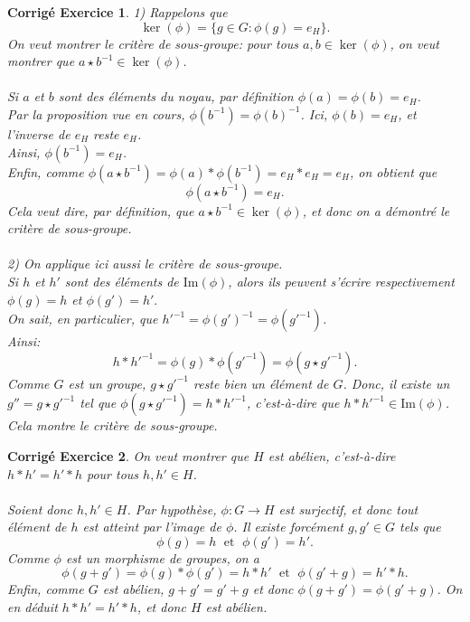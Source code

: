 \documentclass[11pt,french,table]{article}
\theoremstyle{exercice}
\theoremstyle{corrigé}
\newtheorem{corrigé}{Corrigé Exercice}
\begin{document}
\vspace{2em}
\begin{corrigé}
1) Rappelons que $$\ker(\phi) = \{ g \in G : \phi(g)=e_H \}.$$
On veut montrer le critère de sous-groupe: pour tous $a,b \in \ker(\phi)$, on veut montrer que $a \star b^{-1} \in \ker(\phi)$. \\ \\
Si $a$ et $b$ sont des éléments du noyau, par définition $\phi(a)=\phi(b) = e_H$. \\
Par la proposition vue en cours, $\phi(b^{-1}) = \phi(b)^{-1}$. Ici, $\phi(b)=e_H$, et l'inverse de $e_H$ reste $e_H$. \\
Ainsi, $\phi(b^{-1}) = e_H$. \\
Enfin, comme $\phi(a \star b^{-1}) = \phi(a) * \phi(b^{-1})=e_H * e_H = e_H$, on obtient que $$\phi(a \star b^{-1}) = e_H.$$ 
Cela veut dire, par définition, que $a \star b^{-1} \in \ker(\phi)$, et donc on a démontré le critère de sous-groupe. \\
\\
2) On applique ici aussi le critère de sous-groupe. \\
Si $h$ et $h'$ sont des éléments de $\text{Im}(\phi)$, alors ils peuvent s'écrire respectivement $\phi(g) = h$ et $\phi(g') = h'.$ \\
On sait, en particulier, que $h'^{-1} = \phi(g')^{-1} = \phi(g'^{-1})$. \\
Ainsi:
$$h * h'^{-1} = \phi(g) * \phi(g'^{-1}) = \phi(g \star g'^{-1}).$$
Comme $G$ est un groupe, $g \star g'^{-1}$ reste bien un élément de $G$. Donc, il existe un $g'' = g \star g'^{-1}$ tel que $\phi(g \star g'^{-1}) = h * h'^{-1}$, c'est-à-dire que $h * h'^{-1} \in \text{Im}(\phi)$. \\
Cela montre le critère de sous-groupe.
\end{corrigé}
\vspace{2em}
\begin{corrigé}
On veut montrer que $H$ est abélien, c'est-à-dire $h * h' = h' * h$ pour tous $h,h' \in H$. \\
\\
Soient donc $h,h' \in H$. Par hypothèse, $\phi : G \longrightarrow H$ est surjectif, et donc tout élément de $h$ est atteint par l'image de $\phi$. Il existe forcément $g, g' \in G$ tels que $$\phi(g) = h \; \text{ et } \; \phi(g') = h'.$$
Comme $\phi$ est un morphisme de groupes, on a $$\phi(g + g') = \phi(g) * \phi(g') = h * h' \; \text{ et } \; \phi(g'+g) = h' * h.$$
Enfin, comme $G$ est abélien, $g+g'=g'+g$ et donc $\phi(g+g')=\phi(g'+g)$. On en déduit $h * h' = h' * h$, et donc $H$ est abélien.
\end{corrigé}
\end{document}
